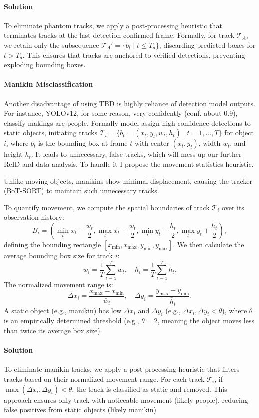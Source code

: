 \documentclass[12pt, a4paper]{article}
\begin{document}
\paragraph{Solution}
To eliminate phantom tracks, we apply a post-processing heuristic that terminates tracks at the last detection-confirmed frame. Formally, for track $\mathcal{T}_A$, we retain only the subsequence $\mathcal{T}_A' = \{b_t \mid t \leq T_d\}$, discarding predicted boxes for $t > T_d$. This ensures that tracks are anchored to verified detections, preventing exploding bounding boxes.


\paragraph{Manikin Misclassification}
Another disadvantage of using TBD is highly reliance of detection model outputs. For instance, YOLOv12, for some reason, very confidently (conf. about 0.9), classify makings are people.
Formally model assign high-confidence detections to static objects, initiating tracks $\mathcal{T}_i = \{b_t = (x_t, y_t, w_t, h_t) \mid t = 1, \dots, T\}$ for object $i$, where $b_t$ is the bounding box at frame $t$ with center $(x_t, y_t)$, width $w_t$, and height $h_t$. It leads to unnecessary, false tracks, which will mess up our further ReID and data analysis. To handle it I propose the movement statistics heuristic. 

Unlike moving objects, manikins show minimal displacement, causing the tracker (BoT-SORT) to maintain such unnecessary tracks.

To quantify movement, we compute the spatial boundaries of track $\mathcal{T}_i$ over its observation history:
\[
B_i = \left( \min_t x_t - \frac{w_t}{2}, \max_t x_t + \frac{w_t}{2}, \min_t y_t - \frac{h_t}{2}, \max_t y_t + \frac{h_t}{2} \right),
\]
defining the bounding rectangle $[x_{\min}, x_{\max}, y_{\min}, y_{\max}]$. We then calculate the average bounding box size for track $i$:
\[
\bar{w}_i = \frac{1}{T} \sum_{t=1}^T w_t, \quad \bar{h}_i = \frac{1}{T} \sum_{t=1}^T h_t.
\]
The normalized movement range is:
\[
\Delta x_i = \frac{x_{\max} - x_{\min}}{\bar{w}_i}, \quad \Delta y_i = \frac{y_{\max} - y_{\min}}{\bar{h}_i}.
\]
A static object (e.g., manikin) has low $\Delta x_i$ and $\Delta y_i$ (e.g., $\Delta x_i, \Delta y_i < \theta$), where $\theta$ is an empirically determined threshold (e.g., $\theta = 2$, meaning the object moves less than twice its average box size).


\paragraph{Solution}
To eliminate manikin tracks, we apply a post-processing heuristic that filters tracks based on their normalized movement range. For each track $\mathcal{T}_i$, if $\max(\Delta x_i, \Delta y_i) < \theta$, the track is classified as static and removed. This approach ensures only track with noticeable movement (likely people), reducing false positives from static objects (likely manikin)
\end{document}
